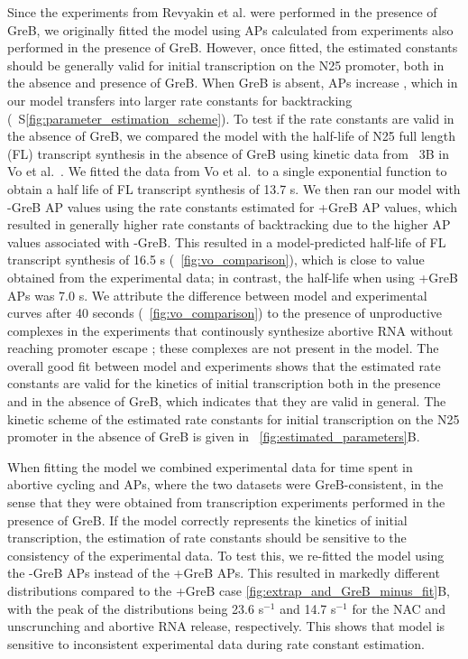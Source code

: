 Since the experiments from Revyakin et al. were performed in the presence of
GreB, we originally fitted the model using APs calculated from experiments
also performed in the presence of GreB. However, once fitted, the estimated
constants should be generally valid for initial transcription on the N25
promoter, both in the absence and presence of GreB. When GreB is absent, APs
increase \cite{hsu_initial_2006}, which in our model transfers into larger
rate constants for backtracking (\FIG~S\ref{fig:parameter_estimation_scheme}).
To test if the rate constants are valid in the absence of GreB, we compared
the model with the half-life of N25 full length (FL) transcript synthesis in
the absence of GreB using kinetic data from \FIG~3B in Vo et al.\
\cite{vo_vitro_2003-1}. We fitted the data from Vo et al.\ to a single
exponential function to obtain a half life of FL transcript synthesis of 13.7
s. We then ran our model with -GreB AP values using the rate constants
estimated for +GreB AP values, which resulted in generally higher rate
constants of backtracking due to the higher AP values associated with -GreB.
This resulted in a model-predicted half-life of FL transcript synthesis of
16.5 s (\FIG~\ref{fig:vo_comparison}), which is close to value obtained from
the experimental data; in contrast, the half-life when using +GreB APs was 7.0
s. We attribute the difference between model and experimental curves after 40
seconds (\FIG~\ref{fig:vo_comparison}) to the presence of unproductive
complexes in the experiments that continously synthesize abortive RNA without
reaching promoter escape \cite{vo_vitro_2003-1}; these complexes are not
present in the model. The overall good fit between model and experiments shows
that the estimated rate constants are valid for the kinetics of initial
transcription both in the presence and in the absence of GreB, which indicates
that they are valid in general. The kinetic scheme of the estimated rate
constants for initial transcription on the N25 promoter in the absence of GreB
is given in \FIG~\ref{fig:estimated_parameters}B.

When fitting the model we combined experimental data for time spent in
abortive cycling and APs, where the two datasets were GreB-consistent, in the
sense that they were obtained from transcription experiments performed in the
presence of GreB. If the model correctly represents the kinetics of initial
transcription, the estimation of rate constants should be sensitive to the
consistency of the experimental data. To test this, we re-fitted the model
using the -GreB APs instead of the +GreB APs. This resulted in markedly
different distributions compared to the +GreB case
\ref{fig:extrap_and_GreB_minus_fit}B, with the peak of the distributions being
23.6 s$^{-1}$ and 14.7 s$^{-1}$ for the NAC and unscrunching and abortive RNA
release, respectively. This shows that model is sensitive to inconsistent
experimental data during rate constant estimation.

